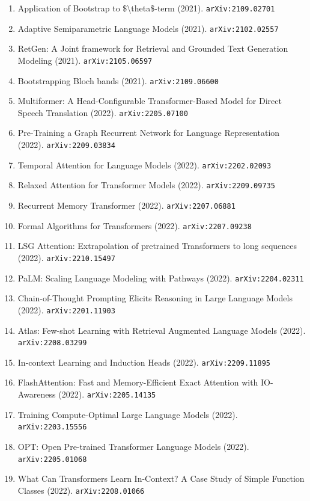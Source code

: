 \documentclass[11pt]{article}
\begin{document}
\begin{enumerate}
  \item Application of Bootstrap to \$\textbackslash{}theta\$-term (2021). \texttt{arXiv:2109.02701}
  \item Adaptive Semiparametric Language Models (2021). \texttt{arXiv:2102.02557}
  \item RetGen: A Joint framework for Retrieval and Grounded Text Generation
  Modeling (2021). \texttt{arXiv:2105.06597}
  \item Bootstrapping Bloch bands (2021). \texttt{arXiv:2109.06600}
  \item Multiformer: A Head-Configurable Transformer-Based Model for Direct
  Speech Translation (2022). \texttt{arXiv:2205.07100}
  \item Pre-Training a Graph Recurrent Network for Language Representation (2022). \texttt{arXiv:2209.03834}
  \item Temporal Attention for Language Models (2022). \texttt{arXiv:2202.02093}
  \item Relaxed Attention for Transformer Models (2022). \texttt{arXiv:2209.09735}
  \item Recurrent Memory Transformer (2022). \texttt{arXiv:2207.06881}
  \item Formal Algorithms for Transformers (2022). \texttt{arXiv:2207.09238}
  \item LSG Attention: Extrapolation of pretrained Transformers to long
  sequences (2022). \texttt{arXiv:2210.15497}
  \item PaLM: Scaling Language Modeling with Pathways (2022). \texttt{arXiv:2204.02311}
  \item Chain-of-Thought Prompting Elicits Reasoning in Large Language Models (2022). \texttt{arXiv:2201.11903}
  \item Atlas: Few-shot Learning with Retrieval Augmented Language Models (2022). \texttt{arXiv:2208.03299}
  \item In-context Learning and Induction Heads (2022). \texttt{arXiv:2209.11895}
  \item FlashAttention: Fast and Memory-Efficient Exact Attention with
  IO-Awareness (2022). \texttt{arXiv:2205.14135}
  \item Training Compute-Optimal Large Language Models (2022). \texttt{arXiv:2203.15556}
  \item OPT: Open Pre-trained Transformer Language Models (2022). \texttt{arXiv:2205.01068}
  \item What Can Transformers Learn In-Context? A Case Study of Simple Function
  Classes (2022). \texttt{arXiv:2208.01066}

\end{enumerate}
\end{document}
